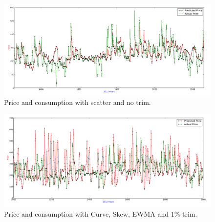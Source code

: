 \begin{figure}[H]
\centering
\includegraphics[width=\linewidth]{billeder/PriceExperimentalAnalysis/X3_Price_Consump_NoTrim.png}
\caption{Price and consumption with scatter and no trim.}
\label{fig:X3_Price_Consump_NoTrim}
\end{figure}

\begin{figure}[H]
\centering
\includegraphics[width=\linewidth]{billeder/PriceExperimentalAnalysis/X3_Price_Consump_Worst.png}
\caption{Price and consumption with Curve, Skew, EWMA and 1\% trim.}
\label{fig:X3_Price_Consump_Worst}
\end{figure}

